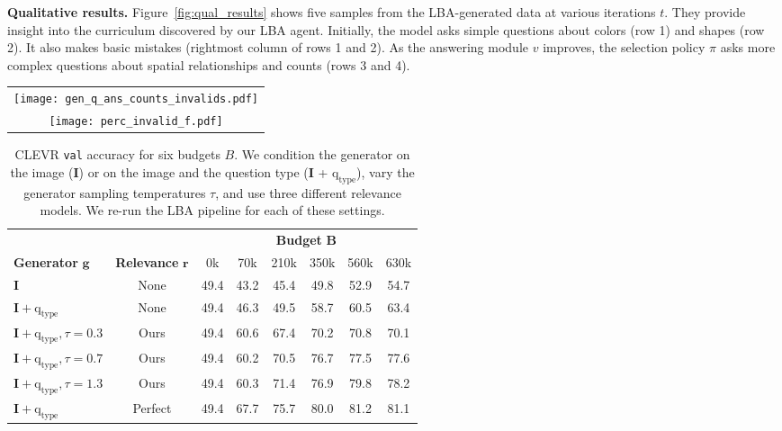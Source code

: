 \documentclass[10pt,twocolumn,letterpaper]{article}
\newcommand{\image}{\mathbf{I}}
\newcommand{\qtype}{\mathrm{q_{type}}}
\newcommand{\clevrval}{\texttt{val}\xspace}
\begin{document}
\par \noindent \textbf{Qualitative results.} Figure~\ref{fig:qual_results} shows five samples from the LBA-generated data at various iterations $t$. They provide insight into the curriculum discovered by our LBA agent. Initially, the model asks simple questions about colors (row 1) and shapes (row 2). It also makes basic mistakes (rightmost column of rows 1 and 2). As the answering module $v$ improves, the selection policy $\pi$ asks more complex questions about spatial relationships and counts (rows 3 and 4). 


\begin{table}[!t]
  \setlength\extrarowheight{-3pt}
\centering\footnotesize{
        \begin{tabular}{@{}c@{}}
    \texttt{[image: gen\_q\_ans\_counts\_invalids.pdf]}
    \vspace{-0.1in}
    \\
        \texttt{[image: perc\_invalid\_f.pdf]}
    \vspace{-0.05in}
            \end{tabular}
    \vspace{-0.15in}
        \vspace{-0.1in}
    \label{fig:q_proposals}
}
\end{table}

\begin{table}[!t]
\setlength{\tabcolsep}{0.25em}
\centering
\footnotesize{
    \begin{tabular}{@{}lc|cccccc@{}}
     & & \multicolumn{6}{c}{\textbf{Budget} $\bm{B}$} \\
    \textbf{Generator} $\bm{g}$ & \textbf{Relevance} $\bm{r}$ & 0k & 70k & 210k & 350k & 560k & 630k \\
    \shline
    $\image$ & None & 49.4 & 43.2 & 45.4 & 49.8 & 52.9 & 54.7 \\
    $\image + \qtype$ & None & 49.4 & 46.3 & 49.5 & 58.7 & 60.5 & 63.4 \\
    \hline
    $\image + \qtype, \tau\!=\!0.3$ & Ours & 49.4 & 60.6 & 67.4 & 70.2 & 70.8 & 70.1 \\
    $\image + \qtype, \tau\!=\!0.7$ & Ours & 49.4 & 60.2 & 70.5 & 76.7 & 77.5 & 77.6 \\
    $\image + \qtype, \tau\!=\!1.3$ & Ours & 49.4 & 60.3 & 71.4 & 76.9 & 79.8 & 78.2 \\
    \hline
    $\image + \qtype$ & Perfect & 49.4 & 67.7 & 75.7 & 80.0 & 81.2 & 81.1
    \end{tabular}
\vspace{-0.5em}
\caption{CLEVR \clevrval accuracy for six budgets $B$. We condition the generator on the image ($\image$) or on the image and the question type ($\image$ + $\qtype$), vary the generator sampling temperatures $\tau$, and use three different relevance models. We re-run the LBA pipeline for each of these settings.}
\label{tab:ablation}
\vspace{-0.5em}
}
\end{table}
\end{document}
